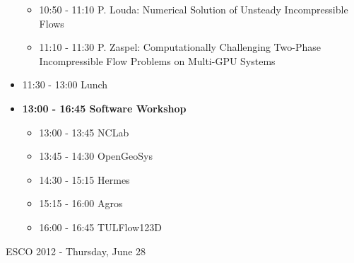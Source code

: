\documentclass[10pt, A4]{article}%
\begin{document}
\begin{itemize}
\begin{itemize}
    \item 10:50 - 11:10 P. Louda: Numerical Solution of Unsteady Incompressible Flows
    \item 11:10 - 11:30 P. Zaspel: Computationally Challenging Two-Phase Incompressible Flow Problems on Multi-GPU Systems
  \end{itemize}
  \item 11:30 - 13:00 Lunch
  \item {\bf 13:00 - 16:45 Software Workshop}
  \begin{itemize}
    \item 13:00 - 13:45 NCLab 
    \item 13:45 - 14:30 OpenGeoSys
    \item 14:30 - 15:15 Hermes
    \item 15:15 - 16:00 Agros
    \item 16:00 - 16:45 TULFlow123D 
  \end{itemize}
\end{itemize}

\newpage

\centerline{\huge ESCO 2012 - Thursday, June 28}
\vspace{4mm}
\end{document}
